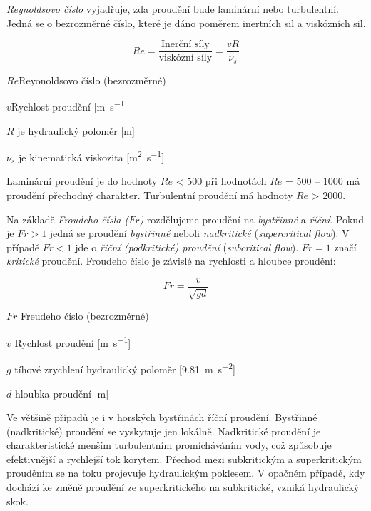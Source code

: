 \emph{Reynoldsovo číslo} vyjadřuje, zda proudění bude laminární nebo turbulentní. Jedná se o bezrozměrné číslo, které je dáno poměrem inertních sil a viskózních sil.

\begin{equation}\label{key}
	Re = \frac{\text{Inerční síly}}{\text{viskózní síly}} = \frac{vR}{\nu_{s}}
\end{equation}

\begin{eqexpl}
	\item{$Re$}Reyonoldsovo číslo (bezrozměrné)
	\item{$v$}Rychlost proudění [\si{\metre\per\second}]
	\item{$R$} je hydraulický poloměr [\si{\metre}]
	\item{$\nu_{s}$} je kinematická viskozita [\si{\metre\squared\per\second}]
\end{eqexpl}

Laminární proudění je do hodnoty $Re$ < $500$ při hodnotách $Re$ = $500$ -- $1000$ má proudění přechodný charakter. Turbulentní proudění má hodnoty $Re$ > $2000$.

Na základě \emph{Froudeho čísla ($Fr$)} rozdělujeme proudění na \emph{bystřinné} a \emph{říční}. Pokud je $Fr >1$ jedná se proudění \emph{bystřinné} neboli \emph{nadkritické} (\textit{supercritical flow}). V případě $Fr <1$ jde o \emph{říční (podkritické) proudění} (\textit{subcritical flow}). $Fr = 1$ značí \emph{kritické} proudění. Froudeho číslo je závislé na rychlosti a hloubce proudění:

\begin{equation}
	Fr=\frac{v}{\sqrt{gd}}
\end{equation}

\begin{eqexpl}
	\item{$Fr$} Freudeho číslo (bezrozměrné)
	\item{$v$} Rychlost proudění [\si{\metre\per\second}]
	\item{$g$} tíhové zrychlení hydraulický poloměr [\SI{9,81}{\metre\per\second\squared}]
	\item{$d$} hloubka proudění [\si{\metre}]
\end{eqexpl}

Ve většině případů je i v horských bystřinách říční proudění. Bystřinné (nadkritické) proudění se vyskytuje jen lokálně. Nadkritické proudění je charakteristické menším turbulentním promícháváním vody, což způsobuje efektivnější a rychlejší tok korytem. Přechod mezi subkritickým a superkritickým prouděním se na toku projevuje hydraulickým poklesem. V opačném případě, kdy dochází ke změně proudění ze superkritického na subkritické, vzniká hydraulický skok. 

